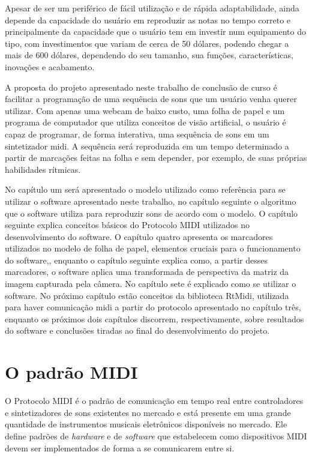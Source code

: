 \documentclass[12pt]{report}
\begin{document}
Apesar de ser um periférico de fácil utilização e de rápida
adaptabilidade, ainda depende da capacidade do usuário em reproduzir
as notas no tempo correto e principalmente da capacidade que o usuário
tem em investir num equipamento do tipo, com investimentos que variam
de cerca de 50 dólares, podendo chegar a mais de 600 dólares,
dependendo do seu tamanho, sua funções, características, inovações e
acabamento.

A proposta do projeto apresentado neste trabalho de conclusão de curso
é facilitar a programação de uma sequência de sons que um usuário
venha querer utilizar. Com apenas uma webcam de baixo custo, uma folha
de papel e um programa de computador que utiliza conceitos de visão
artificial, o usuário é capaz de programar, de forma interativa, uma
sequência de sons em um sintetizador midi. A sequência será
reproduzida em um tempo determinado a partir de marcações feitas na
folha e sem depender, por exemplo, de suas próprias habilidades
rítmicas.

No capítulo um será apresentado o modelo utilizado como referência
para se utilizar o software apresentado neste trabalho, no capítulo
seguinte o algoritmo que o software utiliza para reproduzir sons de
acordo com o modelo. O capítulo seguinte explica conceitos básicos do
Protocolo MIDI utilizados no desenvolvimento do software. O capítulo
quatro apresenta os marcadores utilizados no modelo de folha de
papel, elementos cruciais para o funcionamento do software,, enquanto
o capítulo seguinte explica como, a partir desses marcadores, o
software aplica uma transformada de perspectiva da matriz da imagem
capturada pela câmera. No capítulo sete é explicado como se utilizar o
software. No próximo capítulo estão conceitos da biblioteca RtMidi,
utilizada para haver comunicação midi a partir do protocolo
apresentado no capítulo três, enquanto os próximos dois capítulos
discorrem, respectivamente, sobre resultados do software e conclusões
tiradas ao final do desenvolvimento do projeto.

\chapter{O padrão MIDI}
\label{cha:midi}

O Protocolo MIDI \cite{midi} é o padrão de comunicação em tempo real
entre controladores e sintetizadores de sons existentes no mercado e
está presente em uma grande quantidade de instrumentos musicais
eletrônicos disponíveis no mercado. Ele define padrões de {\it
  hardware} e de {\it software} que estabelecem como dispositivos MIDI
devem ser implementados de forma a se comunicarem entre si.
\end{document}
